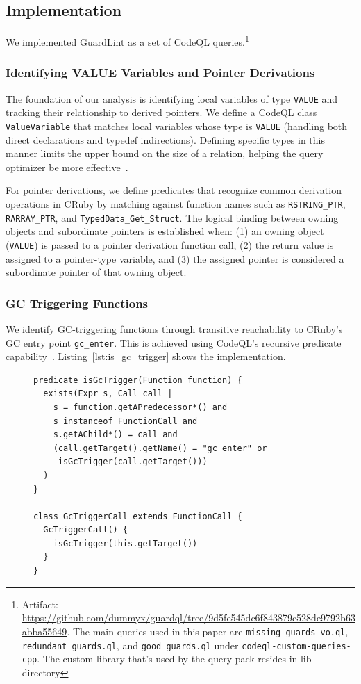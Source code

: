 \subsection{Implementation}\label{sec:implementation}

We implemented GuardLint as a set of CodeQL queries.\footnote{Artifact: \url{https://github.com/dummyx/guardql/tree/9d5fe545dc6f843879c528de9792b63abba55649}. The main queries used in this paper are \texttt{missing\_guards\_vo.ql}, \texttt{redundant\_guards.ql}, and \texttt{good\_guards.ql} under \texttt{codeql-custom-queries-cpp}. The custom library that's used by the query pack resides in lib\/ directory}

\subsubsection*{Identifying VALUE Variables and Pointer Derivations}
The foundation of our analysis is identifying local variables of type \texttt{VALUE} and tracking their relationship to derived pointers. We define a CodeQL class \texttt{ValueVariable} that matches local variables whose type is \texttt{VALUE} (handling both direct declarations and typedef indirections). Defining specific types in this manner limits the upper bound on the size of a relation, helping the query optimizer be more effective~\cite{codeql_specific_types}.

For pointer derivations, we define predicates that recognize common derivation operations in CRuby by matching against function names such as \texttt{RSTRING\_PTR}, \texttt{RARRAY\_PTR}, and \texttt{TypedData\_Get\_Struct}. The logical binding between owning objects and subordinate pointers is established when: (1) an owning object (\texttt{VALUE}) is passed to a pointer derivation function call, (2) the return value is assigned to a pointer-type variable, and (3) the assigned pointer is considered a subordinate pointer of that owning object.

\subsubsection*{GC Triggering Functions}
We identify GC-triggering functions through transitive reachability to CRuby's GC entry point \texttt{gc\_enter}. This is achieved using CodeQL's recursive predicate capability~\cite{codeql_recursion}. Listing~\ref{lst:is_gc_trigger} shows the implementation.

\begin{figure}[tb]
\begin{lstlisting}[caption={CodeQL predicate for GC trigger detection via call-graph reachability.},label={lst:is_gc_trigger}]
predicate isGcTrigger(Function function) {
  exists(Expr s, Call call |
    s = function.getAPredecessor*() and
    s instanceof FunctionCall and
    s.getAChild*() = call and
    (call.getTarget().getName() = "gc_enter" or
     isGcTrigger(call.getTarget()))
  )
}

class GcTriggerCall extends FunctionCall {
  GcTriggerCall() {
    isGcTrigger(this.getTarget())
  }
}
\end{lstlisting}
\end{figure}

